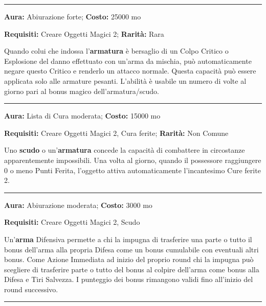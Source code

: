 \begin{multicols}{2}
\smallskip\noindent\rule{\linewidth}{2pt}  \hypertarget{Denegante}{}\medskip{}\noindent\label{Denegante}

\textbf{Aura:} Abiurazione forte; \textbf{Costo:} 25000 mo

\textbf{Requisiti:} Creare Oggetti Magici 2; \textbf{Rarità:} Rara

Quando colui che indossa l'\textbf{armatura} è bersaglio di un Colpo Critico o Esplosione del danno effettuato con un'arma da mischia, può automaticamente negare questo Critico e renderlo un attacco normale. Questa capacità può essere applicata solo alle armature pesanti. L'abilità è usabile un numero di volte al giorno pari al bonus magico dell'armatura/scudo.

\smallskip\noindent\rule{\linewidth}{2pt}  \hypertarget{Determinazione}{}\medskip{}\noindent\label{Determinazione}

\textbf{Aura:} Lista di Cura moderata; \textbf{Costo:} 15000 mo

\textbf{Requisiti:} Creare Oggetti Magici 2, Cura ferite; \textbf{Rarità:} Non Comune

Uno \textbf{scudo} o un'\textbf{armatura} concede la capacità di combattere in circostanze apparentemente impossibili. Una volta al giorno, quando il possessore raggiungere 0 o meno Punti Ferita, l'oggetto attiva automaticamente l'incantesimo Cure ferite 2.

\smallskip\noindent\rule{\linewidth}{2pt}  \hypertarget{Difensiva}{}\medskip{}\noindent\label{Difensiva}

\textbf{Aura:} Abiurazione moderata; \textbf{Costo:} 3000 mo

\textbf{Requisiti:} Creare Oggetti Magici 2, Scudo

Un'\textbf{arma} Difensiva permette a chi la impugna di trasferire una parte o tutto il bonus dell'arma alla propria Difesa come un bonus cumulabile con eventuali altri bonus. Come Azione Immediata ad inizio del proprio round chi la impugna può scegliere di trasferire parte o tutto del bonus al colpire dell'arma come bonus alla Difesa e Tiri Salvezza. I punteggio dei bonus rimangono validi fino all'inizio del round successivo.

\smallskip\noindent\rule{\linewidth}{2pt}  \hypertarget{DifesadagliIncantesimi}{}\medskip{}\noindent\label{DifesadagliIncantesimi}


\end{multicols}
